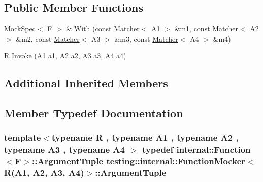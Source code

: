 \subsection*{Public Member Functions}
\begin{DoxyCompactItemize}
\item 
\hyperlink{classtesting_1_1internal_1_1MockSpec}{Mock\+Spec}$<$ \hyperlink{classtesting_1_1internal_1_1FunctionMocker_3_01R_07A1_00_01A2_00_01A3_00_01A4_08_4_a9be04bb962edb1458c857ca8e9db9318}{F} $>$ \& \hyperlink{classtesting_1_1internal_1_1FunctionMocker_3_01R_07A1_00_01A2_00_01A3_00_01A4_08_4_ac29a206739844575e1b92de03be8ad29}{With} (const \hyperlink{classtesting_1_1Matcher}{Matcher}$<$ A1 $>$ \&m1, const \hyperlink{classtesting_1_1Matcher}{Matcher}$<$ A2 $>$ \&m2, const \hyperlink{classtesting_1_1Matcher}{Matcher}$<$ A3 $>$ \&m3, const \hyperlink{classtesting_1_1Matcher}{Matcher}$<$ A4 $>$ \&m4)
\item 
R \hyperlink{classtesting_1_1internal_1_1FunctionMocker_3_01R_07A1_00_01A2_00_01A3_00_01A4_08_4_ac20228ed7a21f43775a08fb3b1661721}{Invoke} (A1 a1, A2 a2, A3 a3, A4 a4)
\end{DoxyCompactItemize}
\subsection*{Additional Inherited Members}


\subsection{Member Typedef Documentation}
\subsubsection[{\texorpdfstring{Argument\+Tuple}{ArgumentTuple}}]{\setlength{\rightskip}{0pt plus 5cm}template$<$typename R , typename A1 , typename A2 , typename A3 , typename A4 $>$ typedef {\bf internal\+::\+Function}$<${\bf F}$>$\+::{\bf Argument\+Tuple} {\bf testing\+::internal\+::\+Function\+Mocker}$<$ R(A1, A2, A3, A4)$>$\+::{\bf Argument\+Tuple}}\hypertarget{classtesting_1_1internal_1_1FunctionMocker_3_01R_07A1_00_01A2_00_01A3_00_01A4_08_4_a97576d71dfe85cbb0fc51fcaad6d4cc1}{}\label{classtesting_1_1internal_1_1FunctionMocker_3_01R_07A1_00_01A2_00_01A3_00_01A4_08_4_a97576d71dfe85cbb0fc51fcaad6d4cc1}
